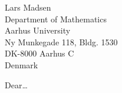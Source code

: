 \documentclass[%
 english,              %
 bss,                  %
 unit=math,            %
]{aultrdesign}
\begin{document}
\begin{ColophonData}
\end{ColophonData}
\begin{ReceiverAddress}
  Lars Madsen\\
  Department of Mathematics\\
  Aarhus University\\
  Ny Munkegade 118, Bldg. 1530\\
  DK-8000 Aarhus C\\
  Denmark
\end{ReceiverAddress}

\begin{Letter}
\opening{Dear\dots}

\kant[1] %

\end{Letter}
\end{document}
